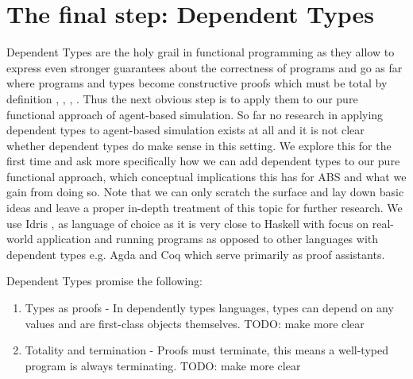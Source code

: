 \section{The final step: Dependent Types}
Dependent Types are the holy grail in functional programming as they allow to express even stronger guarantees about the correctness of programs and go as far where programs and types become constructive proofs \cite{wadler_propositions_2015} which must be total by definition \cite{thompson_type_1991}, \cite{altenkirch_why_2005}, \cite{altenkirch_pi_sigma:_2010}, \cite{program_homotopy_2013}. Thus the next obvious step is to apply them to our pure functional approach of agent-based simulation. So far no research in applying dependent types to agent-based simulation exists at all and it is not clear whether dependent types do make sense in this setting. We explore this for the first time and ask more specifically how we can add dependent types to our pure functional approach, which conceptual implications this has for ABS and what we gain from doing so. Note that we can only scratch the surface and lay down basic ideas and leave a proper in-depth treatment of this topic for further research. We use Idris \cite{brady_idris_2013}, \cite{brady_type-driven_2017} as language of choice as it is very close to Haskell with focus on real-world application and running programs as opposed to other languages with dependent types e.g. Agda and Coq which serve primarily as proof assistants.

Dependent Types promise the following:

\begin{enumerate}
	\item Types as proofs - In dependently types languages, types can depend on any values and are first-class objects themselves. TODO: make more clear
	\item Totality and termination - Proofs must terminate, this means a well-typed program is always terminating. TODO: make more clear
\end{enumerate}


